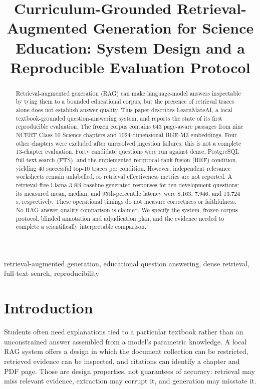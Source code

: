 \documentclass[conference]{IEEEtran}
\begin{document}
\title{Curriculum-Grounded Retrieval-Augmented Generation for Science Education: System Design and a Reproducible Evaluation Protocol}

\author{
}

\maketitle

\begin{abstract}
Retrieval-augmented generation (RAG) can make language-model answers inspectable by tying them to a bounded educational corpus, but the presence of retrieval traces alone does not establish answer quality. This paper describes LearnMateAI, a local textbook-grounded question-answering system, and reports the state of its first reproducible evaluation. The frozen corpus contains 643 page-aware passages from nine NCERT Class 10 Science chapters and 1024-dimensional BGE-M3 embeddings. Four other chapters were excluded after unresolved ingestion failures; this is not a complete 13-chapter evaluation. Forty candidate questions were run against dense, PostgreSQL full-text search (FTS), and the implemented reciprocal-rank-fusion (RRF) condition, yielding 40 successful top-10 traces per condition. However, independent relevance worksheets remain unlabelled, so retrieval effectiveness metrics are not reported. A retrieval-free Llama 3 8B baseline generated responses for ten development questions; its measured mean, median, and 95th-percentile latency were 8.163, 7.946, and 13.724 s, respectively. These operational timings do not measure correctness or faithfulness. No RAG answer-quality comparison is claimed. We specify the system, frozen-corpus protocol, blinded annotation and adjudication plan, and the evidence needed to complete a scientifically interpretable comparison.
\end{abstract}

\begin{IEEEkeywords}
retrieval-augmented generation, educational question answering, dense retrieval, full-text search, reproducibility
\end{IEEEkeywords}

\section{Introduction}
Students often need explanations tied to a particular textbook rather than an unconstrained answer assembled from a model's parametric knowledge. A local RAG system offers a design in which the document collection can be restricted, retrieved evidence can be inspected, and citations can identify a chapter and PDF page. Those are design properties, not guarantees of accuracy: retrieval may miss relevant evidence, extraction may corrupt it, and generation may misstate it.
\end{document}
